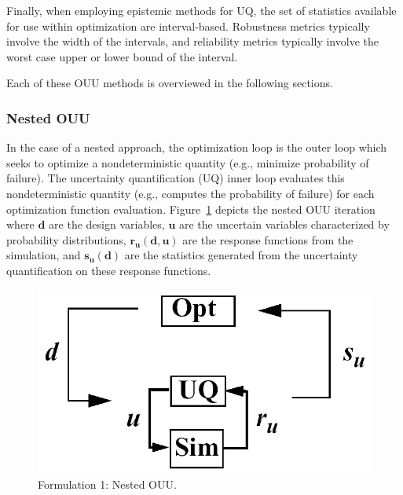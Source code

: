 Finally, when employing epistemic methods for UQ, the set of
statistics available for use within optimization are interval-based.
Robustness metrics typically involve the width of the intervals, and
reliability metrics typically involve the worst case upper or lower
bound of the interval.

Each of these OUU methods is overviewed in the following sections.

\subsubsection{Nested OUU}\label{models:ex:ouu:nested}

In the case of a nested approach, the optimization loop is the outer
loop which seeks to optimize a nondeterministic quantity (e.g.,
minimize probability of failure). The uncertainty quantification (UQ)
inner loop evaluates this nondeterministic quantity (e.g., computes
the probability of failure) for each optimization function evaluation.
Figure~\ref{models:ex:figure08} depicts the nested OUU iteration where
$\mathit{\mathbf{d}}$ are the design variables, $\mathit{\mathbf{u}}$
are the uncertain variables characterized by probability
distributions, $\mathit{\mathbf{r_{u}(d,u)}}$ are the response
functions from the simulation, and $\mathit{\mathbf{s_{u}(d)}}$ are
the statistics generated from the uncertainty quantification on these
response functions.

\begin{figure}
  \centering
  \includegraphics[scale=0.33]{images/nested_ouu}
  \caption{Formulation 1: Nested OUU.}
  \label{models:ex:figure08}
\end{figure}

